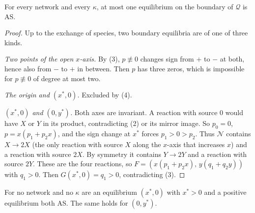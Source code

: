 \documentclass[11pt,a4paper]{report}
\newcommand{\Q}{\mathcal{Q}}
\newcommand{\Net}{\mathcal{N}}
\newcommand{\rx}[2]{\(#1\to#2\)}
\begin{document}
\begin{proposition}\label{prop:bdry}
For every network and every \(\kappa\), at most one equilibrium on the boundary of \(\Q\) is AS.
\end{proposition}

\begin{proof}
Up to the exchange of species, two boundary equilibria are of one of three kinds.

\emph{Two points of the open \(x\)-axis.} By (3), \(p\not\equiv0\) changes sign from \(+\) to \(-\)
at both, hence also from \(-\) to \(+\) in between. Then \(p\) has three zeros, which is impossible for
\(p\not\equiv0\) of degree at most two.

\emph{The origin and \((x^*,0)\).} Excluded by (4).

\emph{\((x^*,0)\) and \((0,y^*)\).} Both axes are invariant. A reaction with source \(0\) would have \(X\) or \(Y\) in
its product, contradicting (2) or its mirror image. So \(p_0=0\), \(p=x(p_1+p_2x)\), and the sign
change at \(x^*\) forces \(p_1>0>p_2\).
Thus \(\Net\) contains \rx{X}{2X} (the only reaction with source \(X\) along the \(x\)-axis that increases \(x\)) and a
reaction with source \(2X\). By symmetry it contains \rx{Y}{2Y} and a reaction with source \(2Y\). These are the
four reactions, so \(F=(x(p_1+p_2x),\,y(q_1+q_2y))\) with \(q_1>0\). Then \(G(x^*,0)=q_1>0\), contradicting
(3).
\end{proof}

\begin{proposition}\label{prop:axispos}
For no network and no \(\kappa\) are an equilibrium \((x^*,0)\) with \(x^*>0\) and a positive equilibrium both AS.
The same holds for \((0,y^*)\).
\end{proposition}
\end{document}
